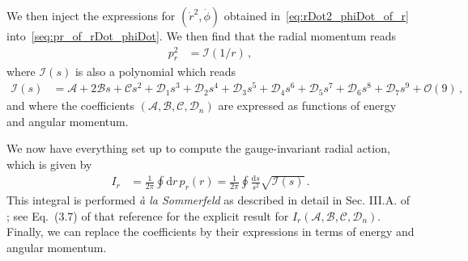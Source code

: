 \documentclass[prd,superscriptaddress,preprintnumbers,tightenlines,nofootinbib, eqsecnum]{revtex4-2}
\renewcommand{\dd}{\mathrm{d}}
\begin{document}
We then inject the  expressions for $(\dot{r}^2,\dot{\phi})$ obtained in~\eqref{eq:rDot2_phiDot_of_r}  into~\eqref{seq:pr_of_rDot_phiDot}. We then find that the radial momentum reads
\begin{align}   \label{eq:pr2_of_r}
    p_r^2&=\mathcal{I}(1/r) \,,
\end{align}
where $\mathcal{I}(s)$ is also a polynomial which reads
\begin{align} \label{eq:I_of_s}
   \mathcal{I}(s) &= \mathcal{A} + 2\mathcal{B} s + \mathcal{C} s^2 + \mathcal{D}_1 s^3 + \mathcal{D}_2 s^4 + \mathcal{D}_3 s^5 + \mathcal{D}_4 s^6  + \mathcal{D}_5 s^7 + \mathcal{D}_6 s^8 + \mathcal{D}_7 s^9 + \mathcal{O}(9)  \,,
\end{align}
and where the coefficients  $(\mathcal{A},\mathcal{B},\mathcal{C},\mathcal{D}_n)$ are expressed as functions of energy and angular momentum.

We now have everything set up to compute the gauge-invariant radial action, which is given by
\begin{align} \label{eq:Ir_loop_integral}
    I_r &= \frac{1}{2\pi} \oint \dd r \,p_r(r)= \frac{1}{2\pi} \oint \frac{\dd s}{s^2} \sqrt{\mathcal{I}(s)} \,.
\end{align}
This integral is performed \textit{à la Sommerfeld} as described in detail in Sec. III.A. of \cite{Trestini:2025yyc}; see Eq.~(3.7) of that reference for the explicit result for $I_r(\mathcal{A},\mathcal{B},\mathcal{C},\mathcal{D}_n)$. Finally, we can replace the coefficients by their expressions in terms of energy and angular momentum.
\end{document}
